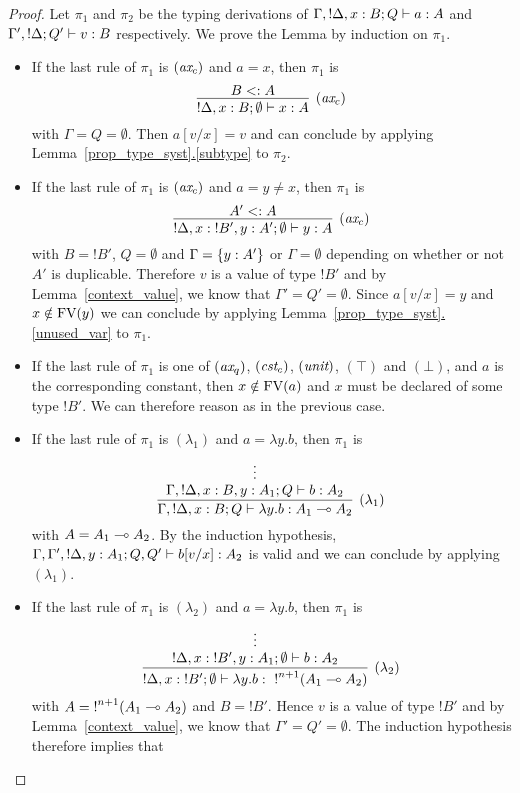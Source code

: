 \documentclass[twoside]{article}
\begin{document}
\begin{proof}
Let $\pi_1$ and $\pi_2$ be the typing derivations  of 
$\Gamma,{!}\Delta,x:B;Q \vdash a:A$ and  $\Gamma',{!}\Delta;Q' \vdash v:B$ 
respectively. We prove the Lemma by induction on $\pi_1$.
\begin{itemize}
 \item If the last rule of $\pi_1$ is $(\textit{ax}_c)$ and $a=x$, then $\pi_1$ is
 \[
   \infer[(\rul{ax}_c)]{{!}\Delta, x:B;\emptyset\entails x:A}{
     B<:A
   }
 \]
 with $\Gamma=Q=\emptyset$. Then $a[v/x]=v$ and can conclude by applying 
 Lemma~\hyperref[subtype]{\ref*{prop_type_syst}.\ref*{subtype}} to $\pi_2$.
 \item If the last rule of $\pi_1$ is $(\textit{ax}_c)$ and $a=y\neq x$, then 
 $\pi_1$ is
 \[
   \infer[(\rul{ax}_c)]{{!}\Delta, x:{!}B',y:A';\emptyset\entails y:A}{
     A'<:A
   }
 \]
 with $B={!}B'$, $Q=\emptyset$ and $\Gamma =\{y:A'\}$ or $\Gamma=\emptyset$ 
 depending on whether or not $A'$ is duplicable. Therefore $v$ is a value of 
 type ${!}B'$ and by Lemma~\hyperref[context_value]{\ref*{context_value}}, 
 we know that $\Gamma'=Q'=\emptyset$. Since $a[v/x]=y$ and $x\notin \mathop{\textrm{FV}}\nolimits(y)$ 
 we can conclude by applying
 Lemma~\hyperref[unused_var]{\ref*{prop_type_syst}.\ref*{unused_var}} to $\pi_1$.
 \item If the last rule of $\pi_1$ is one of $(\textit{ax}_q)$, $(\textit{cst}_c)$, 
 $(\textit{unit})$, $(\top)$ and $(\bot)$, and $a$ is the corresponding constant, 
 then $x\notin \mathop{\textrm{FV}}\nolimits(a)$ and  $x$ must be declared of some type ${!}B'$.
 We can therefore reason as in the previous case. 
 \item If the last rule of $\pi_1$ is $(\lambda_1)$ and $a=\lambda y.b$, then $\pi_1$ is
  \[
   \infer[(\lambda_1)]{\Gamma,{!}\Delta,x:B;Q\entails \lambda y.b:A_1\loli A_2}{
     \deduce[]{\Gamma, {!}\Delta,x:B,y:A_1;Q \entails b:A_2}{
       \vdots
     }
   }
 \]
 with $A=A_1\multimap A_2$. By the induction hypothesis, 
 $\Gamma, \Gamma',{!}\Delta,y:A_1;Q,Q' \vdash b[v/x]:A_2$ is valid and we can conclude
 by applying $(\lambda_1)$.
 \item If the last rule of $\pi_1$ is $(\lambda_2)$ and $a=\lambda y.b$, 
 then $\pi_1$ is
 \[
  \infer[(\lambda_2)]{{!}\Delta, x:{!}B';\emptyset \entails \lambda y.b:~{!}^{n+1}(A_1\loli A_2)}{
    \deduce[]{{!}\Delta, x:{!}B',y:A_1;\emptyset \entails b:A_2}{
      \vdots
    }
  }
 \]
 with $A={!}^{n+1}(A_1\multimap A_2)$ and $B={!}B'$. Hence $v$ is a value of type ${!}B'$ and  
 by Lemma~\hyperref[context_value]{\ref*{context_value}}, we know that
 $\Gamma'=Q'=\emptyset$. The induction hypothesis therefore implies that

\end{itemize}
\end{proof}
\end{document}
